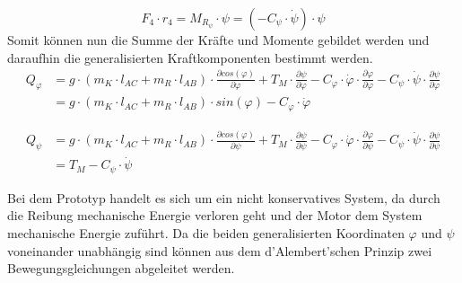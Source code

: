 \begin{equation}
F_4 \cdot r_4 = M_{R_{\psi}} \cdot \psi = (-C_{\psi} \cdot \dot{\psi}) \cdot \psi
\end{equation}
Somit können nun die Summe der Kräfte und Momente gebildet werden und daraufhin die generalisierten Kraftkomponenten bestimmt werden.
\begin{equation}
\begin{split}
Q_{\varphi} &= g \cdot (m_K \cdot l_{AC} + m_R \cdot l_{AB}) \cdot \frac{\partial cos(\varphi)}{\partial \varphi} + T_M \cdot \frac{\partial \psi}{\partial \varphi} - C_{\varphi} \cdot \dot{\varphi} \cdot \frac{\partial \varphi}{\partial \varphi} - C_{\psi} \cdot \dot{\psi} \cdot \frac{\partial \psi}{\partial \varphi} \\
&= g \cdot (m_K \cdot l_{AC} + m_R \cdot l_{AB})\cdot sin(\varphi) - C_{\varphi} \cdot \dot{\varphi}
\end{split}
\end{equation}

\begin{equation}
\begin{split}
Q_{\psi} &= g \cdot (m_K \cdot l_{AC} + m_R \cdot l_{AB}) \cdot \frac{\partial cos(\varphi)}{\partial \psi} + T_M \cdot \frac{\partial \psi}{\partial \psi} - C_{\varphi} \cdot \dot{\varphi} \cdot \frac{\partial \varphi}{\partial \psi} - C_{\psi} \cdot \dot{\psi} \cdot \frac{\partial \psi}{\partial \psi} \\
&= T_M - C_{\psi} \cdot \dot{\psi}
\end{split}
\end{equation}

Bei dem Prototyp handelt es sich um ein nicht konservatives System, da durch die Reibung mechanische Energie verloren geht und der Motor dem System mechanische Energie zuführt. Da die beiden generalisierten Koordinaten $\varphi$ und $\psi$ voneinander unabhängig sind können aus dem d'Alembert'schen Prinzip zwei Bewegungsgleichungen abgeleitet werden.


